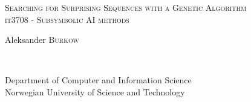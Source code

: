 \begin{titlepage}
  \begin{center}
    \huge
    \noindent\textsc{Searching for Surprising Sequences with a Genetic
Algorithm} \\
    \large
    \noindent\textsc{it3708 - Subsymbolic AI methods} \\ [2cm]
    \large

    \begin{minipage}{0.4\textwidth}
    \centering
      \noindent Aleksander \textsc{Burkow}
    \end{minipage} \\[2cm]


    \vfill

    Department of Computer and Information Science \\
    Norwegian University of Science and Technology \\

  \end{center}
\end{titlepage}
